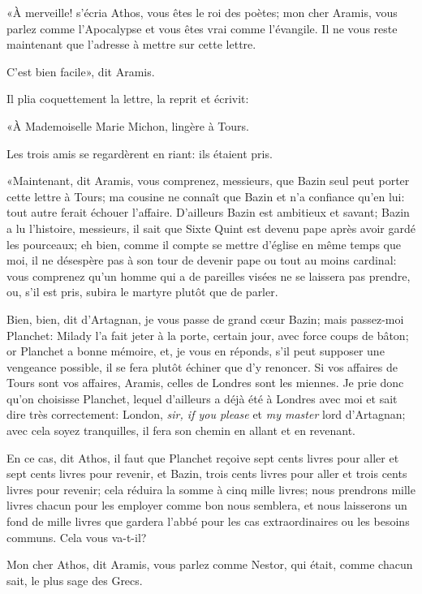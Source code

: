 «À merveille! s'écria Athos, vous êtes le roi des poètes; mon cher Aramis, vous parlez comme l'Apocalypse et vous êtes vrai comme l'évangile. Il ne vous reste maintenant que l'adresse à mettre sur cette lettre. 

\speak  C'est bien facile», dit Aramis. 

Il plia coquettement la lettre, la reprit et écrivit: 

«À Mademoiselle Marie Michon, lingère à Tours. 

Les trois amis se regardèrent en riant: ils étaient pris. 

«Maintenant, dit Aramis, vous comprenez, messieurs, que Bazin seul peut porter cette lettre à Tours; ma cousine ne connaît que Bazin et n'a confiance qu'en lui: tout autre ferait échouer l'affaire. D'ailleurs Bazin est ambitieux et savant; Bazin a lu l'histoire, messieurs, il sait que Sixte Quint est devenu pape après avoir gardé les pourceaux; eh bien, comme il compte se mettre d'église en même temps que moi, il ne désespère pas à son tour de devenir pape ou tout au moins cardinal: vous comprenez qu'un homme qui a de pareilles visées ne se laissera pas prendre, ou, s'il est pris, subira le martyre plutôt que de parler. 

\speak  Bien, bien, dit d'Artagnan, je vous passe de grand cœur Bazin; mais passez-moi Planchet: Milady l'a fait jeter à la porte, certain jour, avec force coups de bâton; or Planchet a bonne mémoire, et, je vous en réponds, s'il peut supposer une vengeance possible, il se fera plutôt échiner que d'y renoncer. Si vos affaires de Tours sont vos affaires, Aramis, celles de Londres sont les miennes. Je prie donc qu'on choisisse Planchet, lequel d'ailleurs a déjà été à Londres avec moi et sait dire très correctement: London, \textit{sir, if you please} et \textit{my master} lord d'Artagnan; avec cela soyez tranquilles, il fera son chemin en allant et en revenant. 

\speak  En ce cas, dit Athos, il faut que Planchet reçoive sept cents livres pour aller et sept cents livres pour revenir, et Bazin, trois cents livres pour aller et trois cents livres pour revenir; cela réduira la somme à cinq mille livres; nous prendrons mille livres chacun pour les employer comme bon nous semblera, et nous laisserons un fond de mille livres que gardera l'abbé pour les cas extraordinaires ou les besoins communs. Cela vous va-t-il? 

\speak  Mon cher Athos, dit Aramis, vous parlez comme Nestor, qui était, comme chacun sait, le plus sage des Grecs. 

